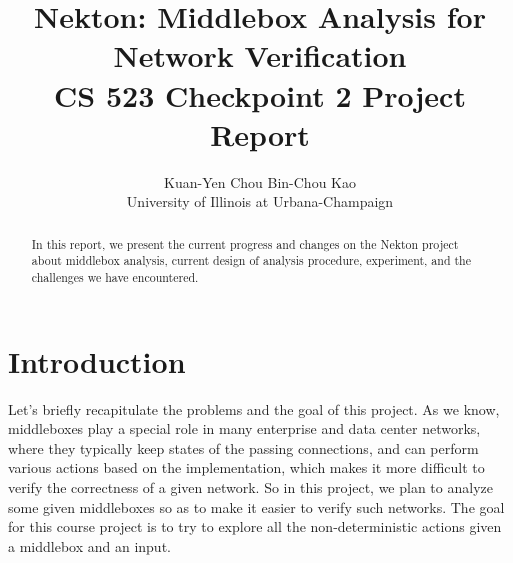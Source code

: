 \usepackage{filecontents}



\date{}

\title{\Large \bf Nekton: Middlebox Analysis for Network Verification\\
CS 523 Checkpoint 2 Project Report}

\author{
{\rm Kuan-Yen Chou}
\qquad
{\rm Bin-Chou Kao}\\
University of Illinois at Urbana-Champaign
} %

\maketitle

\begin{abstract}
In this report, we present the current progress and changes on the Nekton
project about middlebox analysis, current design of analysis procedure,
experiment, and the challenges we have encountered.
\end{abstract}


\section{Introduction}

Let's briefly recapitulate the problems and the goal of this project. As we
know, middleboxes play a special role in many enterprise and data center
networks, where they typically keep states of the passing connections, and can
perform various actions based on the implementation, which makes it more
difficult to verify the correctness of a given network. So in this project, we
plan to analyze some given middleboxes so as to make it easier to verify such
networks. The goal for this course project is to try to explore all the
non-deterministic actions given a middlebox and an input.

